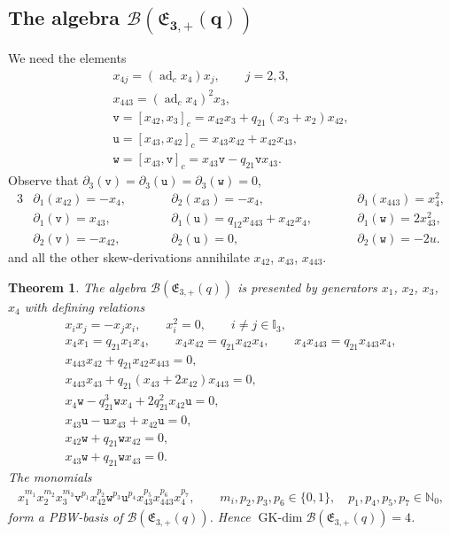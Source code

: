 \documentclass[10pt,a4paper]{amsart}
\numberwithin{equation}{section}
\newtheorem{Theorem}{Theorem}[section]
\newcommand{\adc}{\operatorname{ad}_c}
\newcommand{\GK}{\operatorname{GK-dim}}
\newcommand{\toba}{\mathscr B}
\newcommand{\I}{{\mathbb I}}
\newcommand{\N}{{\mathbb N}}
\newcommand{\ut}{\mathtt{u}}
\newcommand{\vt}{\mathtt{v}}
\newcommand{\wt}{\mathtt{w}}
\newcommand{\eny}{\mathfrak{E}}
\begin{document}
\subsection[The algebra B(E\_\{3,+\}(q))]{The algebra $\boldsymbol{\toba(\eny_{3,+}(q))}$}
We need the elements
\begin{gather*}
x_{4j}=(\adc x_4)x_j, \qquad j=2,3,
\\
x_{443} =(\adc x_4)^2x_3,
\\
\vt =[x_{42}, x_3]_c=x_{42}x_3+q_{21}(x_3+x_2)x_{42},
\\
\ut=[x_{43},x_{42}]_c=x_{43}x_{42}+x_{42}x_{43},
\\
\wt=[x_{43},\vt]_c=x_{43}\vt-q_{21}\vt x_{43}.
\end{gather*}
Observe that $\partial_3(\vt)=\partial_3(\ut)=\partial_3(\wt)=0$,
\begin{alignat}{3}
\label{eq:block-pt-1-derivations}
&\partial_1(x_{42})=-x_4,\qquad &&\partial_2(x_{43}) =-x_4, &&\partial_1(x_{443}) =x_4^2,
\\
&\partial_1(\vt)=x_{43}, &&\partial_1(\ut)=q_{12}x_{443}+x_{42}x_4,\qquad &&\partial_1(\wt)=2x_{43}^2,
\\
&\partial_2(\vt)=-x_{42}, &&\partial_2(\ut)=0, &&\partial_2(\wt)=-2u.
\end{alignat}
and all the other skew-derivations annihilate $x_{42}$, $x_{43}$, $x_{443}$.

\begin{Theorem}\label{thm:q=1,q22=1,n=3} The algebra
$\toba(\eny_{3,+}(q))$
is presented by generators $x_1$, $x_2$, $x_3$, $x_4$ with defining relations
\begin{gather}\label{eq:block-pt-1-rels-0}
x_ix_j=-x_jx_i,\qquad x_i^2 = 0, \qquad i\ne j \in\I_3,
\\
\label{eq:block-pt-1-rels-1}
x_4x_1=q_{21}x_1x_4, \qquad x_4x_{42} = q_{21}x_{42}x_4,\qquad x_4x_{443} = q_{21}x_{443}x_4,
\\
\label{eq:block-pt-1-rels-2}
x_{443}x_{42}+q_{21}x_{42}x_{443} =0,
\\
\label{eq:block-pt-1-rels-3}
x_{443}x_{43}+q_{21}(x_{43}+2x_{42})x_{443} =0,
\\
\label{eq:block-pt-1-rels-4}
x_{4}\wt-q_{21}^3\wt x_{4} +2q_{21}^2 x_{42}\ut= 0,
\\
\label{eq:block-pt-1-rels-4prim}
x_{43}\ut-\ut x_{43}+x_{42}\ut = 0,
\\
\label{eq:block-pt-1-rels-5}
x_{42}\wt+q_{21}\wt x_{42} = 0,
\\
\label{eq:block-pt-1-rels-6}
x_{43}\wt+q_{21}\wt x_{43} = 0.
\end{gather}
The monomials
\begin{align}\label{eq:monomials-eny3+}
x_1^{m_1} x_2^{m_2} x_3^{m_3} \vt^{p_1} x_{42}^{p_2} \wt^{p_3} \ut^{p_4} x_{43}^{p_5} x_{443}^{p_6} x_4^{p_7}, \qquad m_i, p_2, p_3, p_6 \in \{0,1\}, \quad p_1, p_4, p_5, p_7 \in\N_0,
\end{align}
form a PBW-basis of $\toba(\eny_{3,+}(q))$.
Hence $\GK \toba(\eny_{3,+}(q)) =4$.
\end{Theorem}
\end{document}
